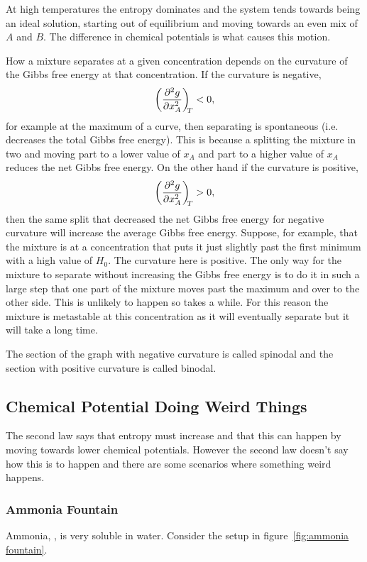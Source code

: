     At high temperatures the entropy dominates and the system tends towards being an ideal solution, starting out of equilibrium and moving towards an even mix of \(A\) and \(B\).
    The difference in chemical potentials is what causes this motion.
    
    How a mixture separates at a given concentration depends on the curvature of the Gibbs free energy at that concentration.
    If the curvature is negative,
    \[\left(\pdv[2]{g}{x_A}\right)_{\!\!{T}} < 0,\]
    for example at the maximum of a curve, then separating is spontaneous (i.e. decreases the total Gibbs free energy).
    This is because a splitting the mixture in two and moving part to a lower value of \(x_A\) and part to a higher value of \(x_A\) reduces the net Gibbs free energy.
    On the other hand if the curvature is positive,
    \[\left(\pdv[2]{g}{x_A}\right)_{\!\!{T}} > 0,\]
    then the same split that decreased the net Gibbs free energy for negative curvature will increase the average Gibbs free energy.
    Suppose, for example, that the mixture is at a concentration that puts it just slightly past the first minimum with a high value of \(H_0\).
    The curvature here is positive.
    The only way for the mixture to separate without increasing the Gibbs free energy is to do it in such a large step that one part of the mixture moves past the maximum and over to the other side.
    This is unlikely to happen so takes a while.
    For this reason the mixture is metastable at this concentration as it will eventually separate but it will take a long time.
    
    The section of the graph with negative curvature is called spinodal and the section with positive curvature is called binodal.
    
    \subsection{Chemical Potential Doing Weird Things}
    The second law says that entropy must increase and that this can happen by moving towards lower chemical potentials.
    However the second law doesn't say how this is to happen and there are some scenarios where something weird happens.
    
    \subsubsection{Ammonia Fountain}
    Ammonia, , is very soluble in water.
    Consider the setup in figure~\ref{fig:ammonia fountain}.
    
